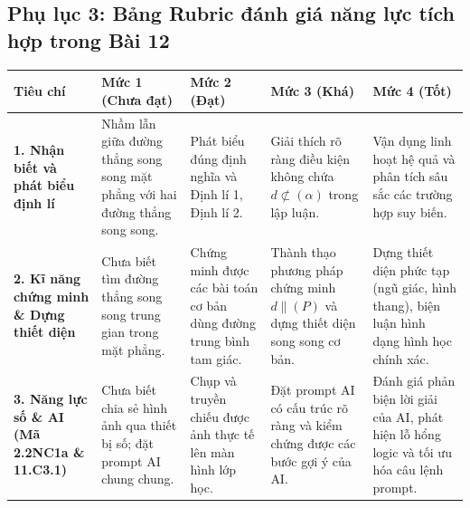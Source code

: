 \documentclass[12pt, a4paper]{article}
\begin{document}
\subsection*{Phụ lục 3: Bảng Rubric đánh giá năng lực tích hợp trong Bài 12}

\begin{center}
\begin{tabularx}{\linewidth}{|p{3.2cm}|X|X|X|X|}
\hline
\textbf{Tiêu chí} & \textbf{Mức 1 (Chưa đạt)} & \textbf{Mức 2 (Đạt)} & \textbf{Mức 3 (Khá)} & \textbf{Mức 4 (Tốt)} \\
\hline
\textbf{1. Nhận biết và phát biểu định lí} & Nhầm lẫn giữa đường thẳng song song mặt phẳng với hai đường thẳng song song. & Phát biểu đúng định nghĩa và Định lí 1, Định lí 2. & Giải thích rõ ràng điều kiện không chứa $d \not\subset (\alpha)$ trong lập luận. & Vận dụng linh hoạt hệ quả và phân tích sâu sắc các trường hợp suy biến. \\
\hline
\textbf{2. Kĩ năng chứng minh \& Dựng thiết diện} & Chưa biết tìm đường thẳng song song trung gian trong mặt phẳng. & Chứng minh được các bài toán cơ bản dùng đường trung bình tam giác. & Thành thạo phương pháp chứng minh $d \parallel (P)$ và dựng thiết diện song song cơ bản. & Dựng thiết diện phức tạp (ngũ giác, hình thang), biện luận hình dạng hình học chính xác. \\
\hline
\textbf{3. Năng lực số \& AI (Mã 2.2NC1a \& 11.C3.1)} & Chưa biết chia sẻ hình ảnh qua thiết bị số; đặt prompt AI chung chung. & Chụp và truyền chiếu được ảnh thực tế lên màn hình lớp học. & Đặt prompt AI có cấu trúc rõ ràng và kiểm chứng được các bước gợi ý của AI. & Đánh giá phản biện lời giải của AI, phát hiện lỗ hổng logic và tối ưu hóa câu lệnh prompt. \\
\hline
\end{tabularx}
\end{center}
\end{document}
